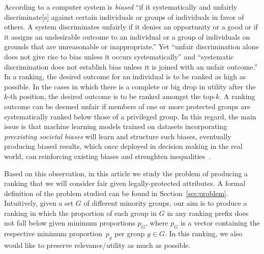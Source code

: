 According to \citet{friedman1996bias} a computer system is \emph{biased} ``if it systematically and unfairly discriminate[s] against certain individuals or groups of individuals in favor of others.
%
A system discriminates unfairly if it denies an opportunity or a good or if it assigns an undesirable outcome to an individual or a group of individuals on grounds that are unreasonable or inappropriate.''
%
Yet ``unfair discrimination alone does not give rise to bias unless it occurs systematically'' and ``systematic discrimination does not establish bias unless it is joined with an unfair outcome.''
%
In a ranking, the desired outcome for an individual is to be ranked as high as possible. In the cases in which there is a complete or big drop in utility after the $k$-th position, the desired outcome is to be ranked amongst the top-$k$. A ranking outcome can be deemed unfair if members of one or more protected groups are systematically ranked below those of a privileged group.
%
%
In this regard, the main issue is that machine learning models trained on datasets incorporating \textit{preexisting societal biases} will learn and structure such biases, eventually producing biased results, which once deployed in decision making in the real world, can reinforcing existing biases and strenghten inequalities~\cite{oneil2016weapons}.
%

Based on this observation, in this article we study the problem of producing a ranking that we will consider fair given legally-protected attributes.
%
A formal definition of the problem studied can be found in Section~\ref{sec:problem}.
%
Intuitively, given a set $G$ of different minority groups, our aim is to produce a ranking in which the proportion of each group in $G$ in any ranking prefix does not fall below given minimum proportions $p_G$, where $p_G$ is a vector containing the respective minimum proportion~$p_g$ per group $g \in G$. In this ranking, we also would like to preserve relevance/utility as much as possible.
%
%


